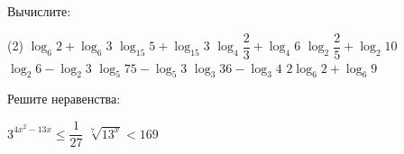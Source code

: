 \begin{class}[number=5]
\begin{listofex}[resume]
		\item Вычислите:
		\begin{tasks}(2)
			\task \( \log_6 2 + \log_6 3 \)
			\task \( \log_{15} 5 + \log_{15} 3 \)
			\task \( \log_4 \dfrac{2}{3} + \log_4 6 \)
			\task \( \log_2 \dfrac{2}{5} + \log_2 10 \)
			\task \( \log_2 6 - \log_2 3 \)
			\task \( \log_5 75 - \log_5 3 \)
			\task \( \log_3 36 - \log_3 4 \)
			\task \( 2\log_6 2 + \log_6 9 \)
		\end{tasks}
		\item Решите неравенства:
		\begin{tasks}
			\task \( 3^{4x^2-13x} \le \dfrac{ 1 }{ 27 } \)
			\task \(\sqrt[7]{13^x} < 169  \)
		\end{tasks}
	\end{listofex}
\end{class}

